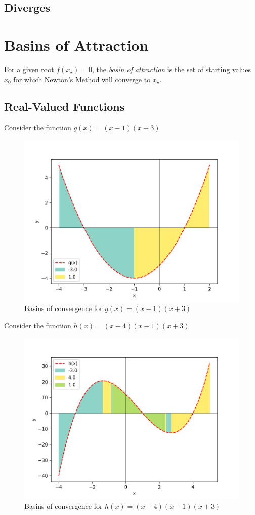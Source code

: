 \documentclass[10pt,a4paper]{article}
\begin{document}
		\subsection{Diverges}
	
	\section{Basins of Attraction}
	For a given root $ f(x_\star) = 0$, the \emph{basin of attraction} is the set of starting values $ x_0 $ for which Newton's Method will converge to $ x_\star $.
	
		\subsection{Real-Valued Functions}
		Consider the function $ g(x) = (x - 1)(x + 3) $
		\begin{figure}[H]
			\caption{Basins of convergence for $g(x) = (x - 1)(x + 3)$}
			\includegraphics[scale=0.75]{figure2}
		\end{figure}
	
		
		Consider the function $ h(x) =  (x - 4)(x - 1)(x + 3)$
		\begin{figure}[H]
			\caption{Basins of convergence for $h(x) = (x - 4)(x - 1)(x + 3)$}
			\includegraphics[scale=0.75]{figure3}
		\end{figure}
	
\end{document}
